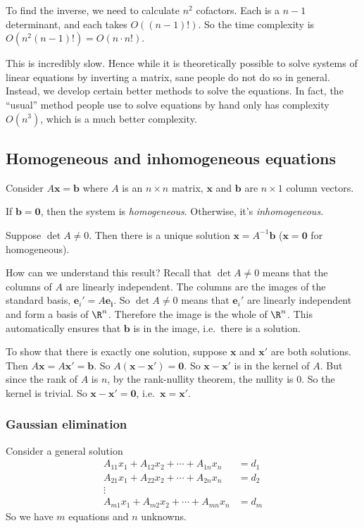 \documentclass[a4paper]{article}
\begin{document}
To find the inverse, we need to calculate $n^2$ cofactors. Each is a $n -1$ determinant, and each takes $O((n - 1)!)$. So the time complexity is $O(n^2 (n - 1)!) = O(n\cdot n!)$.

This is incredibly slow. Hence while it is theoretically possible to solve systems of linear equations by inverting a matrix, sane people do not do so in general. Instead, we develop certain better methods to solve the equations. In fact, the ``usual'' method people use to solve equations by hand only has complexity $O(n^3)$, which is a much better complexity.

\subsection{Homogeneous and inhomogeneous equations}
Consider $A\mathbf{x} = \mathbf{b}$ where $A$ is an $n\times n$ matrix, $\mathbf{x}$ and $\mathbf{b}$ are $n\times 1$ column vectors.
\begin{defi}
  If $\mathbf{b} = \mathbf{0}$, then the system is \emph{homogeneous}. Otherwise, it's \emph{inhomogeneous}.
\end{defi}

Suppose $\det A\not= 0$. Then there is a unique solution $\mathbf{x} = A^{-1}\mathbf{b}$ ($\mathbf{x} = \mathbf{0}$ for homogeneous).

How can we understand this result? Recall that $\det A\not= 0$ means that the columns of $A$ are linearly independent. The columns are the images of the standard basis, $\mathbf{e}_i' = A\mathbf{e_i}$. So $\det A\not = 0$ means that $\mathbf{e}_i'$ are linearly independent and form a basis of $\R^n$. Therefore the image is the whole of $\R^n$. This automatically ensures that $\mathbf{b}$ is in the image, i.e.\ there is a solution.

To show that there is exactly one solution, suppose $\mathbf{x}$ and $\mathbf{x}'$ are both solutions. Then $A\mathbf{x} = A\mathbf{x}' = \mathbf{b}$. So $A(\mathbf{x} - \mathbf{x}') = \mathbf{0}$. So $\mathbf{x} - \mathbf{x}'$ is in the kernel of $A$. But since the rank of $A$ is $n$, by the rank-nullity theorem, the nullity is $0$. So the kernel is trivial. So $\mathbf{x} - \mathbf{x}' = \mathbf{0}$, i.e.\ $\mathbf{x} = \mathbf{x}'$.

\subsubsection{Gaussian elimination}
Consider a general solution
\begin{align*}
  A_{11}x_1 + A_{12}x_2 + \cdots + A_{1n}x_n &= d_1\\
  A_{21}x_1 + A_{22}x_2 + \cdots + A_{2n}x_n &= d_2\\
  \vdots&\\
  A_{m1}x_1 + A_{m2}x_2 + \cdots + A_{mn}x_n &= d_m
\end{align*}
So we have $m$ equations and $n$ unknowns.
\end{document}

